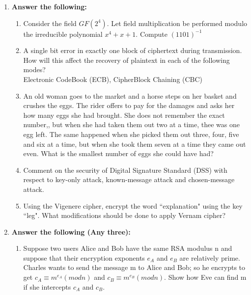 \documentclass{exmppr}
\begin{document}
\begin{enumerate}

\item \textbf{Answer the following:}
\begin{enumerate}
\item Consider the field $GF(2^4)$. Let field multiplication be performed modulo the irreducible polynomial $x^4 + x + 1$. Compute $(1101)^{-1}$

\item A single bit error in exactly one block of ciphertext during transmission. How will this affect the recovery of plaintext in each of the following modes?\\
Electronic CodeBook (ECB), CipherBlock Chaining (CBC)

\item An old woman goes to the market and a horse steps on her basket and crushes the eggs. The rider offers to pay for the damages and asks her how many eggs she had brought. She does not remember the exact number,, but when she had taken them out two at a time, thee was one egg left. The same happened when she picked them out three, four, five and six at a time, but when she took them seven at a time they came out even. What is the smallest number of eggs she could have had?

\item Comment on the security of Digital Signature Standard (DSS) with respect to key-only attack, known-message attack and chosen-message attack.

\item Using the Vigenere cipher, encrypt the word ``explanation" using the key ``leg". What modifications should be done to apply Vernam cipher?
\end{enumerate}
\item \textbf{Answer the following (Any three):}
\begin{enumerate} 
\item Suppose two users Alice and Bob have the same RSA modulus n and suppose that their encryption exponents $e_A$ and $e_B$ are relatively prime. Charles wants to send the message m to Alice and Bob; so he encrypts to get $c_A \equiv m^{e_A}(mod n)$ and $c_B \equiv m^{e_B}(mod n)$. Show how Eve can find m if she intercepts $c_A$ and $c_B$.


\end{enumerate}
\end{enumerate}
\end{document}
